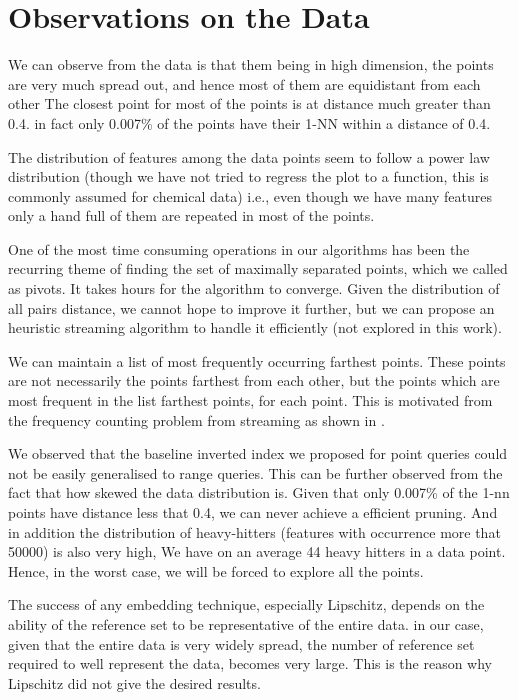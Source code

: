 \section{Observations on the Data}

We can observe from the data is that them being in high dimension, the points are very much spread out, and hence most of them are equidistant from each other
The closest point for most of the points is at distance much greater than 0.4. in fact only 0.007\% of the points have their 1-NN within a distance of 0.4.

The distribution of features among the data points seem to follow a power law distribution (though we have not tried to regress the plot to a function, this is commonly assumed for chemical data)  i.e., even though we have many features only a hand full of them are repeated in most of the points.

One of the most time consuming operations in our algorithms has been the recurring theme of finding the set of maximally separated points, which we called as pivots. It takes hours for the algorithm to converge. Given the distribution of all pairs distance, we cannot hope to improve it further, but we can propose an heuristic streaming algorithm to handle it efficiently (not explored in this work).

We can maintain a list of most frequently occurring farthest points. These points are not necessarily the points farthest from each other, but the points which are most frequent in the list farthest points, for each point. This is motivated from the frequency counting problem from streaming as shown in \citet*{metwally2005efficient}.

We observed that the baseline inverted index we proposed for point queries could not be easily generalised  to range queries. This can be further observed from the fact that how skewed the data distribution is. Given that only 0.007\% of the 1-nn points have distance less that 0.4, we can never achieve a efficient pruning. And in addition the distribution of heavy-hitters (features with occurrence more that 50000) is also very high, We have on an average 44 heavy hitters in a data point. Hence, in the worst case, we will be forced to explore all the points.

The success of any embedding technique, especially Lipschitz, depends on the ability of the reference set to be representative of the entire data. in our case, given that the entire data is very widely spread, the number of reference set required to well represent the data, becomes very large. This is the reason why Lipschitz did not give the desired results.


